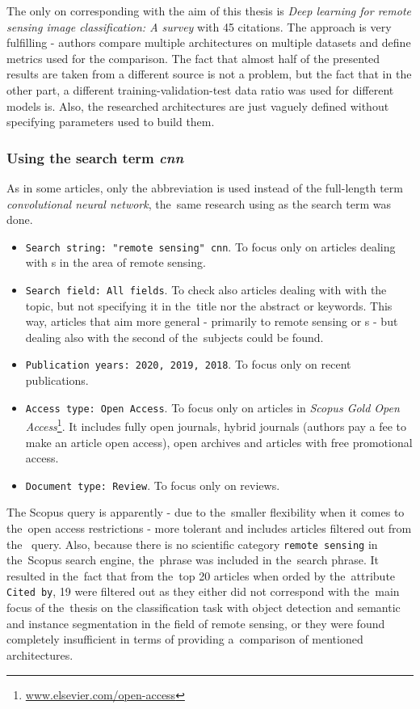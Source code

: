 The only on corresponding with the aim of this thesis is \textit{Deep learning for remote sensing image classification: A survey} \cite{review-dl-rs} with 45 citations. The approach is very fulfilling - authors compare multiple architectures on multiple datasets and define metrics used for the comparison. The fact that almost half of the presented results are taken from a different source is not a problem, but the fact that in the other part, a different training-validation-test data ratio was used for different models is. Also, the researched architectures are just vaguely defined without specifying parameters used to build them.

\subsubsection{Using the search term \textit{cnn}}
\label{scopus-reviews-cnn}

As in some articles, only the abbreviation \textit{} is used instead of the full-length term \textit{convolutional neural network}, the~same research using \textit{} as the search term was done.

\begin{itemize}
	\item \verb|Search string: "remote sensing" cnn|. To focus only on articles dealing with s in the area of remote sensing.
	\item \verb|Search field: All fields|. To check also articles dealing with with the topic, but not specifying it in the~title nor the abstract or keywords. This way, articles that aim more general - primarily to remote sensing or s - but dealing also with the second of the~subjects could be found.
	\item \verb|Publication years: 2020, 2019, 2018|. To focus only on recent publications.
	\item \verb|Access type: Open Access|. To focus only on articles in \textit{Scopus Gold Open Access}\footnote{\url{www.elsevier.com/open-access}}. It includes fully open journals, hybrid journals (authors pay a fee to make an article open access), open archives and articles with free promotional access.
	\item \verb|Document type: Review|. To focus only on reviews.
\end{itemize}

The Scopus query is apparently - due to the~smaller flexibility when it comes to the~open access restrictions - more tolerant and includes articles filtered out from the~ query. Also, because there is no scientific category \verb|remote sensing| in the~Scopus search engine, the~phrase was included in the~search phrase. It resulted in the~fact that from the~top 20 articles when orded by the~attribute \verb|Cited by|, 19 were filtered out as they either did not correspond with the~main focus of the~thesis on the classification task with object detection and semantic and instance segmentation in the field of remote sensing, or they were found completely insufficient in terms of providing a~comparison of mentioned architectures.

